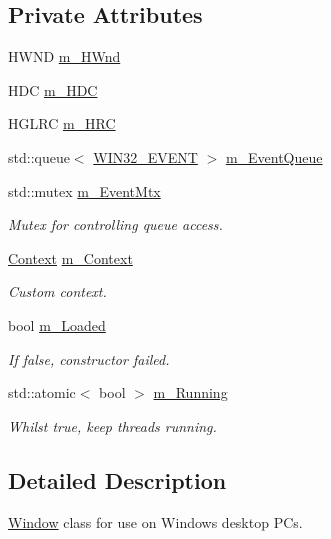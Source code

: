 \subsection*{Private Attributes}
\begin{DoxyCompactItemize}
\item 
H\+W\+ND \hyperlink{class_window_p_c_a49b7d0fb393f4316e78dc753946fd5f9}{m\+\_\+\+H\+Wnd}
\item 
H\+DC \hyperlink{class_window_p_c_af536c182db956b1e87d6f5ba20beb172}{m\+\_\+\+H\+DC}
\item 
H\+G\+L\+RC \hyperlink{class_window_p_c_a5818491db2c9d38e13d4022cf2451889}{m\+\_\+\+H\+RC}
\item 
std\+::queue$<$ \hyperlink{struct_window_p_c_1_1_w_i_n32___e_v_e_n_t}{W\+I\+N32\+\_\+\+E\+V\+E\+NT} $>$ \hyperlink{class_window_p_c_aae73501b77c9ab90594bd9dde22e7416}{m\+\_\+\+Event\+Queue}
\item 
std\+::mutex \hyperlink{class_window_p_c_a1a277bf91c4c052094e7d6ec2005a2c1}{m\+\_\+\+Event\+Mtx}
\begin{DoxyCompactList}\small\item\em Mutex for controlling queue access. \end{DoxyCompactList}\item 
\hyperlink{class_context}{Context} \hyperlink{class_window_p_c_a7610d9a18a51203367a34c4391b170e9}{m\+\_\+\+Context}
\begin{DoxyCompactList}\small\item\em Custom context. \end{DoxyCompactList}\item 
bool \hyperlink{class_window_p_c_a8fa7bd25448521da92f5b12a45392ded}{m\+\_\+\+Loaded}
\begin{DoxyCompactList}\small\item\em If false, constructor failed. \end{DoxyCompactList}\item 
std\+::atomic$<$ bool $>$ \hyperlink{class_window_p_c_a5a79f6bf453401d1e1027e1de926083c}{m\+\_\+\+Running}
\begin{DoxyCompactList}\small\item\em Whilst true, keep threads running. \end{DoxyCompactList}\end{DoxyCompactItemize}


\subsection{Detailed Description}
\hyperlink{class_window}{Window} class for use on Windows desktop P\+Cs. 

